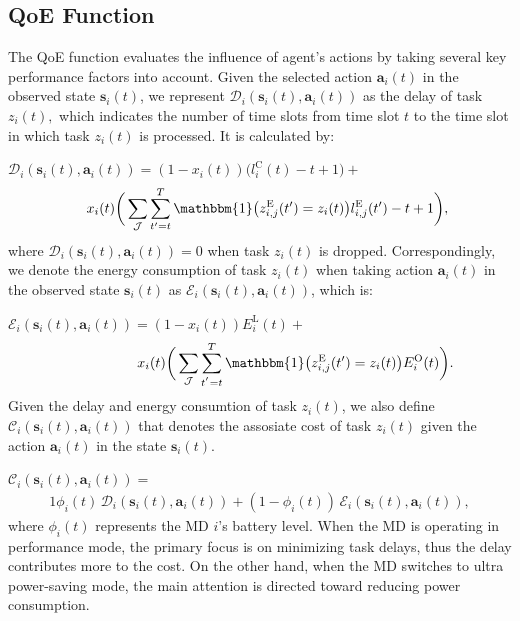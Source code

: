 \documentclass[12pt,draftclsnofoot,onecolumn]{IEEEtran}
\begin{document}
\subsection{QoE Function}
The QoE function evaluates the influence of agent's actions by taking several key performance factors into account. Given the selected action $\boldsymbol{a}_i(t)$ in the observed state $\boldsymbol{s}_i(t)$, we represent $\mathcal{D}_i(\boldsymbol{s}_i(t), \boldsymbol{a}_i(t))$ as the delay of task $z_i(t),$ which indicates the number of time slots from time slot $t$ to the time slot in which task $z_i(t)$ is processed. It is calculated by: 

$\mathcal{D}_i(\boldsymbol{s}_i(t),\boldsymbol{a}_i(t)) = (1-x_i(t))\Big(l_i^{\text{C}}(t) - t + 1\Big)  +$
\begin{alignat}{1}
	\;\;\;\; x_i(t)\bigg( \sum\limits_{\mathcal{J}} \sum\limits_{t'=t}^{T}\mathbbm{1}\big(z_{i,j}^{\text{E}}(t')=z_i(t)\big) l_{i,j}^{\text{E}}(t') - t +1\bigg),
	\label{21}  
\end{alignat} 
where $\mathcal{D}_i(\boldsymbol{s}_i(t),\boldsymbol{a}_i(t))= 0$ when task $z_i(t)$ is dropped. Correspondingly, we denote the energy consumption of task $z_i(t)$ when taking action $\boldsymbol{a}_i(t)$ in the observed state $\boldsymbol{s}_i(t)$ as $\mathcal{E}_i(\boldsymbol{s}_i(t),\boldsymbol{a}_i(t))$, which is: \vspace{1.7mm}

$\mathcal{E}_i(\boldsymbol{s}_i(t),\boldsymbol{a}_i(t)) = (1-x_i(t)) E_i^{\text{L}}(t)+$
\begin{alignat}{1}
	\hspace{1.8cm} x_i(t)\bigg( \sum\limits_{\mathcal{J}} \sum\limits_{t^{'}=t}^{T}\mathbbm{1}\big(z_{i,j}^{\text{E}}(t') = z_i(t)\big) E_i^{\text{O}}(t)  \bigg).
	\label{22}  
\end{alignat}
Given the delay and energy consumtion of task $z_i(t)$, we also define $\mathcal{C}_i(\boldsymbol{s}_i(t),\boldsymbol{a}_i(t))$ that denotes the assosiate cost of task $z_i(t)$ given the action $\boldsymbol{a}_i(t)$ in the state $\boldsymbol{s}_i(t)$. \vspace{1.7mm}


$\mathcal{C}_i(\boldsymbol{s}_i(t),\boldsymbol{a}_i(t)) =$
\begin{alignat}{1}
	\phi_i(t) \, \mathcal{D}_i(\boldsymbol{s}_i(t),\boldsymbol{a}_i(t)) +(1-\phi_i(t)) \, \mathcal{E}_i(\boldsymbol{s}_i(t),\boldsymbol{a}_i(t)),
	\label{23}  
\end{alignat}
where $\phi_i(t)$ represents the MD $i$'s battery level. When the MD is operating in performance mode, the primary focus is on minimizing task delays, thus the delay contributes more to the cost. On the other hand, when the MD switches to ultra power-saving mode, the main attention is directed toward reducing power consumption.
\end{document}
